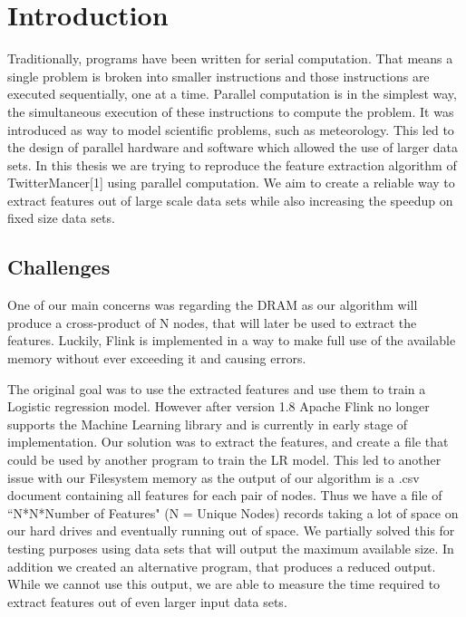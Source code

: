 \chapter{Introduction}


Traditionally, programs have been written for serial computation. That means a single problem is broken into smaller instructions and those instructions are executed sequentially, one at a time. Parallel computation is in the simplest way, the simultaneous execution of these instructions to compute the problem. It was introduced as way to model scientific problems, such as meteorology. This led to the design of parallel hardware and software which allowed the use of larger data sets. In this thesis we are trying to reproduce the feature extraction algorithm of TwitterMancer[1] using parallel computation. We aim to create a reliable way to extract features out of large scale data sets while also increasing the speedup on fixed size data sets.


\section{Challenges}


One of our main concerns was regarding the DRAM as our algorithm will produce a cross-product of N nodes, that will later be used to extract the features. Luckily, Flink is implemented in a way to make full use of the available memory without ever exceeding it and causing errors. 

The original goal was to use the extracted features and use them to train a Logistic regression model. However after version 1.8 Apache Flink no longer supports the Machine Learning library and is currently in early stage of implementation. Our solution was to extract the features, and create a file that could be used by another program to train the LR model. This led to another issue with our Filesystem memory as the output of our algorithm is a .csv document containing all features for each pair of nodes. Thus we have a file of ``N*N*Number of Features" (N = Unique Nodes) records taking a lot of space on our hard drives and eventually running out of space. We partially solved this for testing purposes using data sets that will output the maximum available size. In addition we created an alternative program, that produces a reduced output. While we cannot use this output, we are able to measure the time required to extract features out of even larger input data sets.
